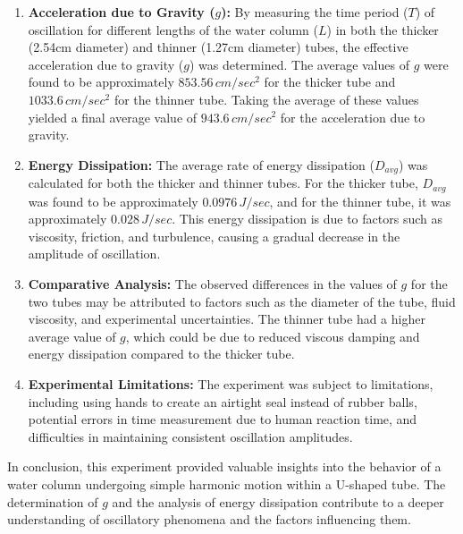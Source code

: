 \documentclass[twocolumn,11pt]{article}
\begin{document}
\begin{enumerate}
    \item \textbf{Acceleration due to Gravity ($g$):} By measuring the time period ($T$) of oscillation for different lengths of the water column ($L$) in both the thicker (2.54cm diameter) and thinner (1.27cm diameter) tubes, the effective acceleration due to gravity ($g$) was determined. The average values of $g$ were found to be approximately $853.56\,cm/sec^2$ for the thicker tube and $1033.6\,cm/sec^2$ for the thinner tube. Taking the average of these values yielded a final average value of $943.6\,cm/sec^2$ for the acceleration due to gravity.
    
    \item \textbf{Energy Dissipation:} The average rate of energy dissipation ($D_{avg}$) was calculated for both the thicker and thinner tubes. For the thicker tube, $D_{avg}$ was found to be approximately $0.0976\,J/sec$, and for the thinner tube, it was approximately $0.028\,J/sec$. This energy dissipation is due to factors such as viscosity, friction, and turbulence, causing a gradual decrease in the amplitude of oscillation.
    
    \item \textbf{Comparative Analysis:} The observed differences in the values of $g$ for the two tubes may be attributed to factors such as the diameter of the tube, fluid viscosity, and experimental uncertainties. The thinner tube had a higher average value of $g$, which could be due to reduced viscous damping and energy dissipation compared to the thicker tube.
    
    \item \textbf{Experimental Limitations:} The experiment was subject to limitations, including using hands to create an airtight seal instead of rubber balls, potential errors in time measurement due to human reaction time, and difficulties in maintaining consistent oscillation amplitudes.
    
  
\end{enumerate}

In conclusion, this experiment provided valuable insights into the behavior of a water column undergoing simple harmonic motion within a U-shaped tube. The determination of $g$ and the analysis of energy dissipation contribute to a deeper understanding of oscillatory phenomena and the factors influencing them.



\end{document}
